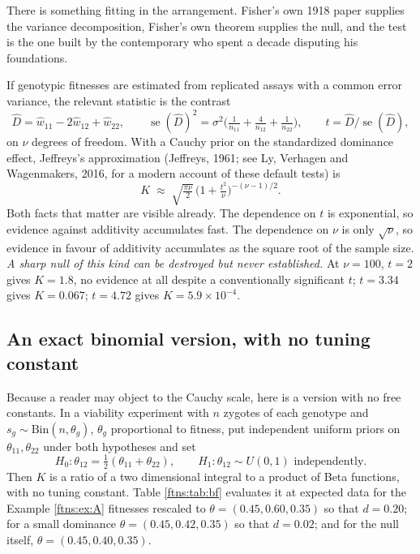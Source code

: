 There is something fitting in the arrangement. Fisher's own 1918 paper supplies the variance
decomposition, Fisher's own theorem supplies the null, and the test is the one built by the
contemporary who spent a decade disputing his foundations.

If genotypic fitnesses are estimated from replicated assays with a common error variance, the
relevant statistic is the contrast
\[
\hat D = \hat w_{11}-2\hat w_{12}+\hat w_{22}, \qquad
\operatorname{se}(\hat D)^2 = \sigma^2\Big(\tfrac{1}{n_{11}}+\tfrac{4}{n_{12}}+\tfrac{1}{n_{22}}\Big),
\qquad t = \hat D/\operatorname{se}(\hat D),
\]
on $\nu$ degrees of freedom. With a Cauchy prior on the standardized dominance effect, Jeffreys's
approximation (Jeffreys, 1961; see Ly, Verhagen and Wagenmakers, 2016, for a modern account of these default tests) is
\begin{equation}
K \;\approx\; \sqrt{\tfrac{\pi\nu}{2}}\,\Big(1+\tfrac{t^2}{\nu}\Big)^{-(\nu-1)/2} .
\label{ftns:eq:jeff}
\end{equation}
Both facts that matter are visible already. The dependence on $t$ is exponential, so evidence
against additivity accumulates fast. The dependence on $\nu$ is only $\sqrt\nu$, so evidence in
favour of additivity accumulates as the square root of the sample size. \emph{A sharp null of this
kind can be destroyed but never established.} At $\nu=100$, $t=2$ gives $K=1.8$, no evidence at all
despite a conventionally significant $t$; $t=3.34$ gives $K=0.067$; $t=4.72$ gives
$K=5.9\times10^{-4}$.

\subsection{An exact binomial version, with no tuning constant}

Because a reader may object to the Cauchy scale, here is a version with no free constants. In a
viability experiment with $n$ zygotes of each genotype and $s_g\sim\text{Bin}(n,\theta_g)$,
$\theta_g$ proportional to fitness, put independent uniform priors on $\theta_{11},\theta_{22}$
under both hypotheses and set
\[
H_0: \theta_{12} = \tfrac12(\theta_{11}+\theta_{22}), \qquad
H_1: \theta_{12} \sim U(0,1) \text{ independently}.
\]
Then $K$ is a ratio of a two dimensional integral to a product of Beta functions, with no tuning
constant. Table \ref{ftns:tab:bf} evaluates it at expected data for the Example \ref{ftns:ex:A} fitnesses
rescaled to $\theta=(0.45,0.60,0.35)$ so that $d=0.20$; for a small dominance
$\theta=(0.45,0.42,0.35)$ so that $d=0.02$; and for the null itself, $\theta=(0.45,0.40,0.35)$.

